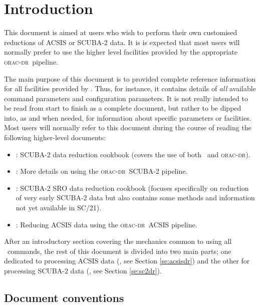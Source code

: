 \documentclass[oneside,11pt]{starlink}
\providecommand{\ORACDR}{\textsc{orac-dr}}
\begin{document}
\scfrontmatter

\section{Introduction\label{se:smurfintro}}

This document is aimed at users who wish to perform their own customised
reductions of ACSIS or SCUBA-2 data. It is is expected that most users
will normally prefer to use the higher level facilities provided by
the appropriate \ORACDR\ pipeline.

The main purpose of this document is to provided complete reference
information for all facilities provided by \SMURF. Thus, for instance, it
contains details of \emph{all} available command parameters and configuration
parameters. It is not really intended to be read from start to finish as
a complete document, but rather to be dipped into, as and when needed,
for information about specific parameters or facilities. Most users
will normally refer to this document during the course of reading the
following higher-level documents:

\begin{itemize}
\item {}: SCUBA-2 data reduction cookbook (covers the use of
both \SMURF\ and \ORACDR).
\item {}: More details on using the \ORACDR\
SCUBA-2 pipeline.
\item {}: SCUBA-2 SRO data reduction cookbook (focuses
specifically on reduction of very early SCUBA-2 data but also contains
some methods and information not yet available in SC/21).
\item {}: Reducing ACSIS data using the \ORACDR\
ACSIS pipeline.
\end{itemize}

After an introductory section covering the mechanics common to using
all \SMURF\ commands, the rest of this document is divided into two main
parts; one dedicated to processing ACSIS data (\cite{acsis}, see Section
\ref{se:acsisdr}) and the other for processing SCUBA-2 data (\cite{scuba2},
see Section \ref{se:sc2dr}).

\subsection{Document conventions}
\end{document}
